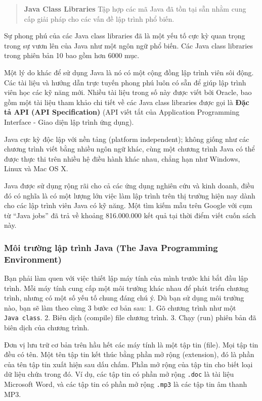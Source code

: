 \begin{quote}
\textbf{Java Class Libraries} Tập hợp các mã Java đã tồn tại sẵn nhằm
cung cấp giải pháp cho các vấn đề lập trình phổ biến.
\end{quote}

Sự phong phú của các Java class libraries đã là một yếu tố cực kỳ quan
trọng trong sự vươn lên của Java như một ngôn ngữ phổ biến. Các Java
class libraries trong phiên bản 10 bao gồm hơn 6000 mục.

Một lý do khác để sử dụng Java là nó có một cộng đồng lập trình viên sôi
động. Các tài liệu và hướng dẫn trực tuyến phong phú luôn có sẵn để giúp
lập trình viên học các kỹ năng mới. Nhiều tài liệu trong số này được
viết bởi Oracle, bao gồm một tài liệu tham khảo chi tiết về các Java
class libraries được gọi là \textbf{Đặc tả API (API Specification)} (API
viết tắt của Application Programming Interface - Giao diện lập trình ứng
dụng).

Java cực kỳ độc lập với nền tảng (platform independent); không giống như
các chương trình viết bằng nhiều ngôn ngữ khác, cùng một chương trình
Java có thể được thực thi trên nhiều hệ điều hành khác nhau, chẳng hạn
như Windows, Linux và Mac OS X.

Java được sử dụng rộng rãi cho cả các ứng dụng nghiên cứu và kinh doanh,
điều đó có nghĩa là có một lượng lớn việc làm lập trình trên thị trường
hiện nay dành cho các lập trình viên Java có kỹ năng. Một tìm kiếm mẫu
trên Google với cụm từ ``Java jobs'' đã trả về khoảng 816.000.000 kết
quả tại thời điểm viết cuốn sách này.

\subsubsection{Môi trường lập trình Java (The Java Programming
Environment)}\label{muxf4i-trux1b0ux1eddng-lux1eadp-truxecnh-java-the-java-programming-environment}

Bạn phải làm quen với việc thiết lập máy tính của mình trước khi bắt đầu
lập trình. Mỗi máy tính cung cấp một môi trường khác nhau để phát triển
chương trình, nhưng có một số yếu tố chung đáng chú ý. Dù bạn sử dụng
môi trường nào, bạn sẽ làm theo cùng 3 bước cơ bản sau: 1. Gõ chương
trình như một \texttt{Java\ class}. 2. Biên dịch (compile) file chương
trình. 3. Chạy (run) phiên bản đã biên dịch của chương trình.

Đơn vị lưu trữ cơ bản trên hầu hết các máy tính là một tập tin (file).
Mọi tập tin đều có tên. Một tên tập tin kết thúc bằng phần mở rộng
(extension), đó là phần của tên tập tin xuất hiện sau dấu chấm. Phần mở
rộng của tập tin cho biết loại dữ liệu chứa trong đó. Ví dụ, các tập tin
có phần mở rộng \texttt{.doc} là tài liệu Microsoft Word, và các tập tin
có phần mở rộng \texttt{.mp3} là các tập tin âm thanh MP3.

